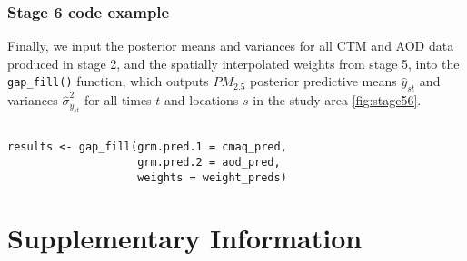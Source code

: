 \documentclass[12pt]{article}
\begin{document}
\subsubsection*{Stage 6 code example}

Finally, we input the posterior means and variances for all CTM and AOD data produced in stage 2, and the spatially interpolated weights from stage 5, into the \texttt{gap\_fill()} function, which outputs $PM_{2.5}$ posterior predictive means $\hat{y}_{st}$ and variances $\hat{\sigma}^{2}_{y_{st}}$ for all times $t$ and locations $s$ in the study area \ref{fig:stage56}.



\begin{lstlisting}

results <- gap_fill(grm.pred.1 = cmaq_pred,
                    grm.pred.2 = aod_pred,
                    weights = weight_preds)

\end{lstlisting}






\section*{Supplementary Information}





\printbibliography
\end{document}
